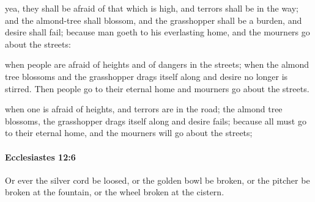 			\begin{versebox}
					\item[BHS] 
					\item[LXX] 
					\item[ASV] yea, they shall be afraid of that which is high, and terrors shall be in the way; and the almond-tree shall blossom, and the grasshopper shall be a burden, and desire shall fail; because man goeth to his everlasting home, and the mourners go about the streets:
					\item[NIV] when people are afraid of heights and of dangers in the streets; when the almond tree blossoms and the grasshopper drags itself along and desire no longer is stirred. Then people go to their eternal home and mourners go about the streets.
					\item[NRSV] when one is afraid of heights, and terrors are in the road; the almond tree blossoms, the grasshopper drags itself along and desire fails; because all must go to their eternal home, and the mourners will go about the streets;
			\end{versebox}

		\paragraph{Ecclesiastes 12:6} %
			\label{ECCLESIASTES-12-6}

			Or ever the silver cord be loosed, or the golden bowl be broken, or the pitcher be broken at the fountain, or the wheel broken at the cistern.

